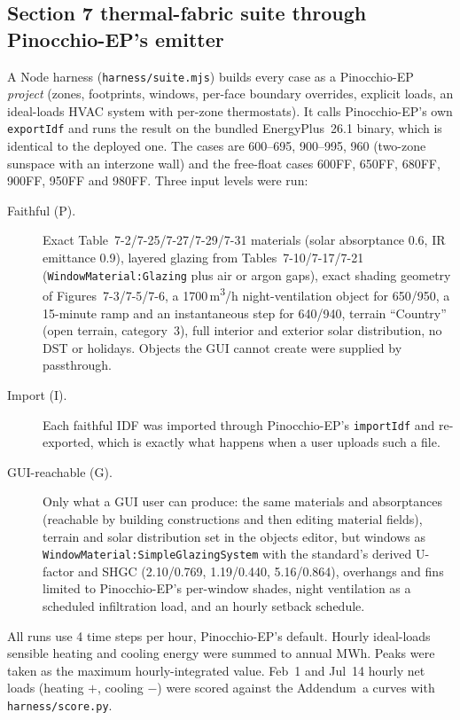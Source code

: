 \documentclass[10pt,a4paper]{article}
\newcommand{\code}[1]{\texttt{\small #1}}
\begin{document}
\subsection{Section 7 thermal-fabric suite through Pinocchio-EP's emitter}
A Node harness (\code{harness/suite.mjs}) builds every case as a Pinocchio-EP \emph{project} (zones, footprints,
windows, per-face boundary overrides, explicit loads, an ideal-loads HVAC system with per-zone thermostats). It
calls Pinocchio-EP's own \code{exportIdf} and runs the result on the bundled EnergyPlus~26.1 binary, which is
identical to the deployed one. The cases are 600--695, 900--995, 960 (two-zone sunspace with an interzone wall) and
the free-float cases 600FF, 650FF, 680FF, 900FF, 950FF and 980FF. Three input levels were run:
\begin{description}
\item[Faithful (P).] Exact Table~7-2/7-25/7-27/7-29/7-31 materials (solar absorptance 0.6, IR emittance 0.9), layered
glazing from Tables~7-10/7-17/7-21 (\code{WindowMaterial:Glazing} plus air or argon gaps), exact shading geometry
of Figures~7-3/7-5/7-6, a 1700\,m\textsuperscript{3}/h night-ventilation object for 650/950, a 15-minute ramp and
an instantaneous step for 640/940, terrain ``Country'' (open terrain, category~3), full interior and exterior solar
distribution, no DST or holidays. Objects the GUI cannot create were supplied by passthrough.
\item[Import (I).] Each faithful IDF was imported through Pinocchio-EP's \code{importIdf} and re-exported, which is
exactly what happens when a user uploads such a file.
\item[GUI-reachable (G).] Only what a GUI user can produce: the same materials and absorptances (reachable by
building constructions and then editing material fields), terrain and solar distribution set in the objects editor,
but windows as \code{WindowMaterial:SimpleGlazingSystem} with the standard's derived U-factor and SHGC
(2.10/0.769, 1.19/0.440, 5.16/0.864), overhangs and fins limited to Pinocchio-EP's per-window shades, night
ventilation as a scheduled infiltration load, and an hourly setback schedule.
\end{description}
All runs use 4 time steps per hour, Pinocchio-EP's default. Hourly ideal-loads sensible heating and cooling energy
were summed to annual MWh. Peaks were taken as the maximum hourly-integrated value. Feb~1 and Jul~14 hourly net
loads (heating $+$, cooling $-$) were scored against the Addendum~a curves with \code{harness/score.py}.
\end{document}
